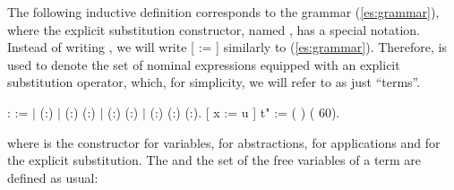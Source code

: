 The following inductive definition corresponds to the grammar (\ref{es:grammar}), where the explicit substitution constructor, named , has a special notation. Instead of writing    , we will write [ := ]  similarly to (\ref{es:grammar}). Therefore,  is used to denote the set of nominal expressions equipped with an explicit substitution operator, which, for simplicity, we will refer to as just ``terms''. 
\begin{coqdoccode}
\coqdocemptyline
\coqdocnoindent
{}  :  :=\coqdoceol
\coqdocindent{0.50em}
\ensuremath{|}  (:)\coqdoceol
\coqdocindent{0.50em}
\ensuremath{|}  (:) (:)\coqdoceol
\coqdocindent{0.50em}
\ensuremath{|}  (:) (:)\coqdoceol
\coqdocindent{0.50em}
\ensuremath{|}  (:) (:) (:).\coqdoceol
\coqdocnoindent
{} [ x := u ] t" := (   ) (  60).\coqdoceol
\coqdocemptyline
\end{coqdoccode}
\noindent where  is the constructor for variables,  for abstractions,  for applications and  for the explicit substitution. The  and the set  of the free variables of a term are defined as usual: 
